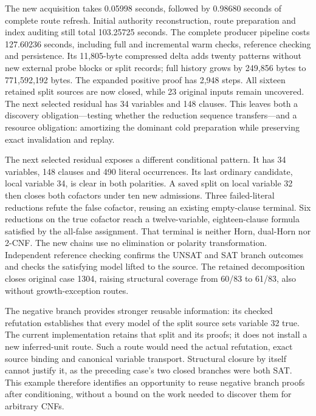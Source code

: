 \documentclass[11pt,a4paper]{article}
\numberwithin{equation}{section}
\theoremstyle{plain}
\theoremstyle{definition}
\theoremstyle{remark}
\begin{document}
The new acquisition takes 0.05998 seconds, followed by 0.98680 seconds of complete route refresh. Initial authority reconstruction, route preparation and index auditing still total 103.25725 seconds. The complete producer pipeline costs 127.60236 seconds, including full and incremental warm checks, reference checking and persistence. Its 11,805-byte compressed delta adds twenty patterns without new external probe blocks or split records; full history grows by 249,856 bytes to 771,592,192 bytes. The expanded positive proof has 2,948 steps. All sixteen retained split sources are now closed, while 23 original inputs remain uncovered. The next selected residual has 34 variables and 148 clauses. This leaves both a discovery obligation---testing whether the reduction sequence transfers---and a resource obligation: amortizing the dominant cold preparation while preserving exact invalidation and replay.

The next selected residual exposes a different conditional pattern. It has 34 variables, 148 clauses and 490 literal occurrences. Its last ordinary candidate, local variable 34, is clear in both polarities. A saved split on local variable 32 then closes both cofactors under ten new admissions. Three failed-literal reductions refute the false cofactor, reusing an existing empty-clause terminal. Six reductions on the true cofactor reach a twelve-variable, eighteen-clause formula satisfied by the all-false assignment. That terminal is neither Horn, dual-Horn nor 2-CNF. The new chains use no elimination or polarity transformation. Independent reference checking confirms the UNSAT and SAT branch outcomes and checks the satisfying model lifted to the source. The retained decomposition closes original case 1304, raising structural coverage from 60/83 to 61/83, also without growth-exception routes.

The negative branch provides stronger reusable information: its checked refutation establishes that every model of the split source sets variable 32 true. The current implementation retains that split and its proofs; it does not install a new inferred-unit route. Such a route would need the actual refutation, exact source binding and canonical variable transport. Structural closure by itself cannot justify it, as the preceding case's two closed branches were both SAT. This example therefore identifies an opportunity to reuse negative branch proofs after conditioning, without a bound on the work needed to discover them for arbitrary CNFs.
\end{document}

